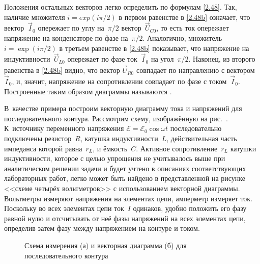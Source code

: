 \documentclass[a4paper,oneside]{book}
\begin{document}
Положения остальных векторов легко определить по формулам \eqref{2.48}. Так,
наличие множителя $i=exp(i\pi/2)$ в первом равенстве в \eqref{2.48b} означает,
что вектор~$\vec I_0$ опережает по углу на~$\pi/2$ вектор~$\vec U_{C0}$, то есть
ток опережает напряжение на конденсаторе по фазе на~$\pi/2$. Аналогично,
множитель $i=\exp(i\pi/2)$ в третьем равенстве в \eqref{2.48b} показывает, что
напряжение на индуктивности~$\vec U_{L0}$ опережает по фазе ток~$\vec I_0$ на
угол~$\pi/2$. Наконец, из второго равенства в \eqref{2.48b} видно, что вектор
$\vec U_{R0}$ совпадает по направлению с вектором~$\vec I_0$, и, значит,
напряжение на сопротивлении совпадает по фазе с током~$\vec I_0$. Построенные
таким образом диаграммы называются .

В~качестве примера построим векторную диаграмму тока и напряжений для
последовательного контура. Рассмотрим схему, изображённую на рис.~.
К~источнику переменного напряжения $\mathcal{E}=\mathcal{E}_0\cos\omega t$
последовательно подключены резистор~$R$, катушка индуктивности~$L$,
действительная часть импеданса которой равна~$r_L$, и ёмкость~$C$. Активное
сопротивление~$r_L$ катушки индуктивности, которое с целью упрощения не
учитывалось выше при аналитическом решении задачи и будет учтено в описаниях
соответствующих лабораторных работ, легко может быть найдено в представленной на
рисунке <<схеме четырёх вольтметров>> с использованием векторной диаграммы.
Вольтметры измеряют напряжения на элементах цепи, амперметр измеряет ток.
Поскольку во всех элементах цепи ток~$I$ одинаков, удобно положить его фазу
равной нулю и отсчитывать от неё фазы напряжений на всех элементах цепи,
определив затем фазу   между напряжением на контуре и током.

\begin{figure}[h]
	\begin{minipage}[h]{0.49\linewidth}
	\end{minipage}
	\hfill
	\begin{minipage}[h]{0.49\linewidth}
	\end{minipage}
	\caption{Схема измерения (а) и векторная  диаграмма (б) для
последовательного контура}
\end{figure}
\end{document}
